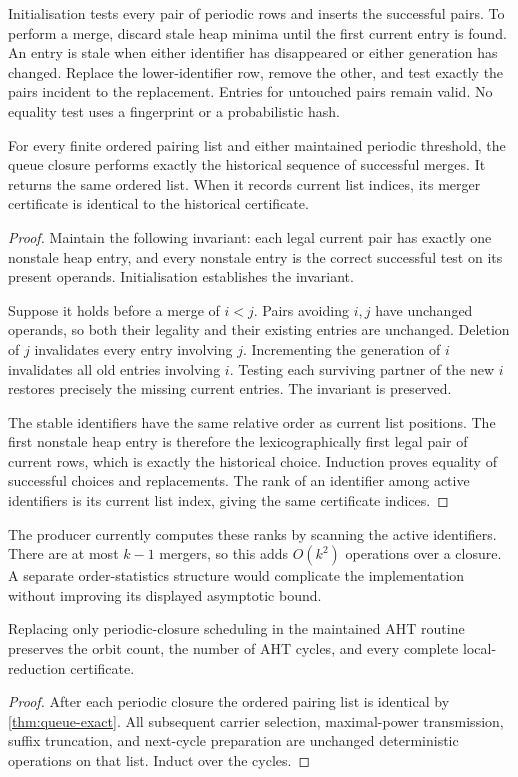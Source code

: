 Initialisation tests every pair of periodic rows and inserts the successful
pairs. To perform a merge, discard stale heap minima until the first
current entry is found. An entry is stale when either identifier has
disappeared or either generation has changed. Replace the lower-identifier
row, remove the other, and test exactly the pairs incident to the
replacement. Entries for untouched pairs remain valid. No equality test
uses a fingerprint or a probabilistic hash.

\begin{theorem}
\label{thm:queue-exact}
For every finite ordered pairing list and either maintained periodic
threshold, the queue closure performs exactly the historical sequence of
successful merges. It returns the same ordered list. When it records current
list indices, its merger certificate is identical to the historical
certificate.
\end{theorem}
\begin{proof}
Maintain the following invariant: each legal current pair has exactly one
nonstale heap entry, and every nonstale entry is the correct successful test
on its present operands. Initialisation establishes the invariant.

Suppose it holds before a merge of \(i<j\). Pairs avoiding \(i,j\) have
unchanged operands, so both their legality and their existing entries are
unchanged. Deletion of \(j\) invalidates every entry involving \(j\).
Incrementing the generation of \(i\) invalidates all old entries involving
\(i\). Testing each surviving partner of the new \(i\) restores precisely
the missing current entries. The invariant is preserved.

The stable identifiers have the same relative order as current list
positions. The first nonstale heap entry is therefore the
lexicographically first legal pair of current rows, which is exactly the
historical choice. Induction proves equality of successful choices and
replacements. The rank of an identifier among active identifiers is its
current list index, giving the same certificate indices.
\end{proof}

The producer currently computes these ranks by scanning the active
identifiers. There are at most \(k-1\) mergers, so this adds \(O(k^2)\)
operations over a closure. A separate order-statistics structure would
complicate the implementation without improving its displayed asymptotic
bound.

\begin{corollary}
\label{cor:trace}
Replacing only periodic-closure scheduling in the maintained AHT routine
preserves the orbit count, the number of AHT cycles, and every complete
local-reduction certificate.
\end{corollary}
\begin{proof}
After each periodic closure the ordered pairing list is identical by
\cref{thm:queue-exact}. All subsequent carrier selection, maximal-power
transmission, suffix truncation, and next-cycle preparation are unchanged
deterministic operations on that list. Induct over the cycles.
\end{proof}

